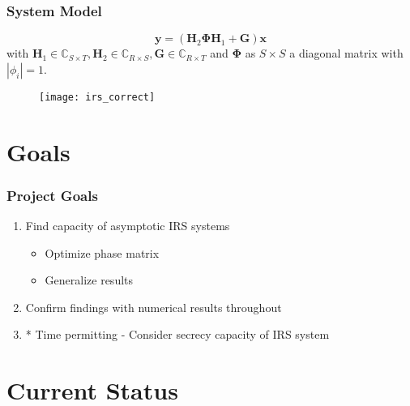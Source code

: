 \documentclass[10pt,tgadventor, onlymath]{beamer}
\begin{document}
\begin{frame}
\frametitle{System Model}
\centering
\begin{equation*}
	\mathbf{y} = (\mathbf{H}_2\boldsymbol{\Phi}\mathbf{H}_1 + \mathbf{G})\mathbf{x}
\end{equation*}
with 
$\mathbf{H}_{1}\in \mathbb{C}_{S \times T},\mathbf{H}_{2} \in \mathbb{C}_{R \times S}, \mathbf{G} \in \mathbb{C}_{R \times T}$ and $\boldsymbol{\Phi}$ as $S \times S$ a diagonal matrix with $| \phi_i | =1$.

	\begin{figure}
		\centering
		\texttt{[image: irs\_correct]}
	\end{figure}
\end{frame}

\section{Goals}
\begin{frame}
\frametitle{Project Goals}
\begin{enumerate}
\item
	Find capacity of asymptotic IRS systems
	\begin{itemize}
	\item 
		Optimize phase matrix
	\item
		Generalize results
	\end{itemize}

\item 
	Confirm findings with numerical results throughout
	
\item
	* Time permitting - Consider secrecy capacity of IRS system
\end{enumerate}
\end{frame}

\section{Current Status}
\end{document}

